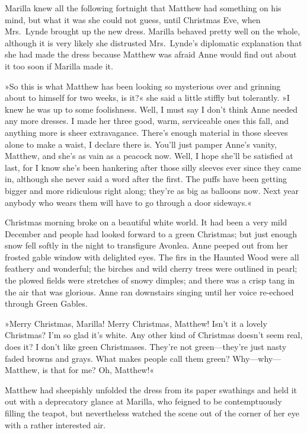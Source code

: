 Marilla knew all the following fortnight that Matthew had something on his mind, but what it was she could not guess, until Christmas Eve, when Mrs.~Lynde brought up the new dress. Marilla behaved pretty well on the whole, although it is very likely she distrusted Mrs.~Lynde's diplomatic explanation that she had made the dress because Matthew was afraid Anne would find out about it too soon if Marilla made it.

»So this is what Matthew has been looking so mysterious over and grinning about to himself for two weeks, is it?« she said a little stiffly but tolerantly. »I knew he was up to some foolishness. Well, I must say I don't think Anne needed any more dresses. I made her three good, warm, serviceable ones this fall, and anything more is sheer extravagance. There's enough material in those sleeves alone to make a waist, I declare there is. You'll just pamper Anne's vanity, Matthew, and she's as vain as a peacock now. Well, I hope she'll be satisfied at last, for I know she's been hankering after those silly sleeves ever since they came in, although she never said a word after the first. The puffs have been getting bigger and more ridiculous right along; they're as big as balloons now. Next year anybody who wears them will have to go through a door sideways.«

Christmas morning broke on a beautiful white world. It had been a very mild December and people had looked forward to a green Christmas; but just enough snow fell softly in the night to transfigure Avonlea. Anne peeped out from her frosted gable window with delighted eyes. The firs in the Haunted Wood were all feathery and wonderful; the birches and wild cherry trees were outlined in pearl; the plowed fields were stretches of snowy dimples; and there was a crisp tang in the air that was glorious. Anne ran downstairs singing until her voice re-echoed through Green Gables.

»Merry Christmas, Marilla! Merry Christmas, Matthew! Isn't it a lovely Christmas? I'm so glad it's white. Any other kind of Christmas doesn't seem real, does it? I don't like green Christmases. They're not green—they're just nasty faded browns and grays. What makes people call them green? Why—why—Matthew, is that for me? Oh, Matthew!«

Matthew had sheepishly unfolded the dress from its paper swathings and held it out with a deprecatory glance at Marilla, who feigned to be contemptuously filling the teapot, but nevertheless watched the scene out of the corner of her eye with a rather interested air.

